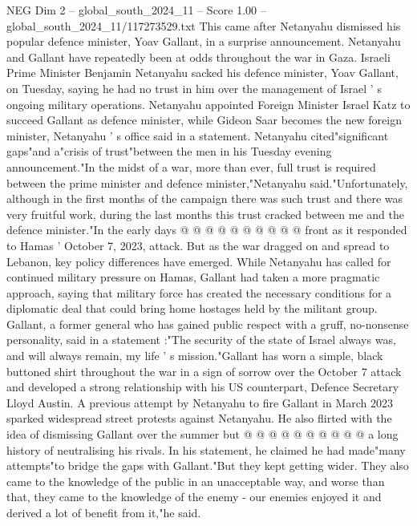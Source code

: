 \begin{textsample}{NEG Dim 2 – global\_south\_2024\_11 – Score 1.00 – global\_south\_2024\_11/117273529.txt}  \label{ex:f2_neg_203}
This came after Netanyahu dismissed his popular defence minister, Yoav Gallant, in a surprise announcement.
Netanyahu and Gallant have repeatedly been at odds throughout the war in Gaza.
Israeli Prime Minister Benjamin Netanyahu sacked his defence minister, Yoav Gallant, on Tuesday, saying he had no trust in him over the management of Israel ' s ongoing military operations.
Netanyahu appointed Foreign Minister Israel Katz to succeed Gallant as defence minister, while Gideon Saar becomes the new foreign minister, Netanyahu ' s office said in a statement.
Netanyahu cited"significant gaps"and a"crisis of trust"between the men in his Tuesday evening announcement."In the midst of a war, more than ever, full trust is required between the prime minister and defence minister,"Netanyahu said."Unfortunately, although in the first months of the campaign there was such trust and there was very fruitful work, during the last months this trust cracked between me and the defence minister."In the early days @ @ @ @ @ @ @ @ @ @ front as it responded to Hamas ' October 7, 2023, attack.
But as the war dragged on and spread to Lebanon, key policy differences have emerged.
While Netanyahu has called for continued military pressure on Hamas, Gallant had taken a more pragmatic approach, saying that military force has created the necessary conditions for a diplomatic deal that could bring home hostages held by the militant group.
Gallant, a former general who has gained public respect with a gruff, no-nonsense personality, said in a statement :"The security of the state of Israel always was, and will always remain, my life ' s mission."Gallant has worn a simple, black buttoned shirt throughout the war in a sign of sorrow over the October 7 attack and developed a strong relationship with his US counterpart, Defence Secretary Lloyd Austin.
A previous attempt by Netanyahu to fire Gallant in March 2023 sparked widespread street protests against Netanyahu.
He also flirted with the idea of dismissing Gallant over the summer but @ @ @ @ @ @ @ @ @ @ a long history of neutralising his rivals.
In his statement, he claimed he had made"many attempts"to bridge the gaps with Gallant."But they kept getting wider.
They also came to the knowledge of the public in an unacceptable way, and worse than that, they came to the knowledge of the enemy - our enemies enjoyed it and derived a lot of benefit from it,"he said.

\end{textsample}
